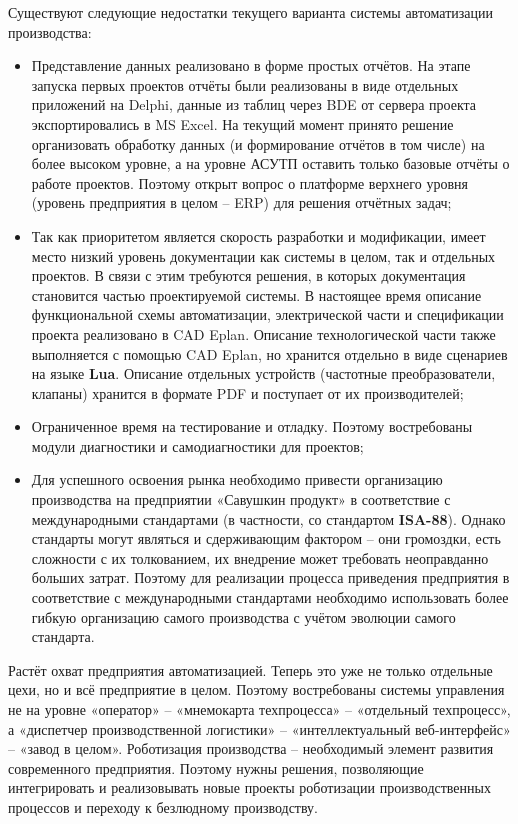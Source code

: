 Существуют следующие недостатки текущего варианта системы автоматизации
производства:
\begin{itemize}
    \item Представление данных реализовано в форме простых отчётов. На этапе
    запуска первых проектов отчёты были реализованы в виде отдельных приложений
    на Delphi, данные из таблиц через BDE от сервера проекта экспортировались в
    MS Excel. На текущий момент принято решение организовать обработку данных (и
    формирование отчётов в том числе) на более высоком уровне, а на уровне АСУТП
    оставить только базовые отчёты о работе проектов. Поэтому открыт вопрос о
    платформе верхнего уровня (уровень предприятия в целом – ERP) для решения
    отчётных задач;
    \item Так как приоритетом является скорость разработки и модификации, имеет
    место низкий уровень документации как системы в целом, так и отдельных
    проектов. В связи с этим требуются решения, в которых документация
    становится частью проектируемой системы. В настоящее время описание
    функциональной схемы автоматизации, электрической части и спецификации
    проекта реализовано в CAD Eplan. Описание технологической части также
    выполняется с помощью CAD Eplan, но хранится отдельно в виде сценариев на
    языке \textbf{Lua}. Описание отдельных устройств (частотные преобразователи,
    клапаны) хранится в формате PDF и поступает от их производителей;
    \item Ограниченное время на тестирование и отладку. Поэтому востребованы
    модули диагностики и самодиагностики для проектов;
    \item Для успешного освоения рынка необходимо привести организацию
    производства на предприятии «Савушкин продукт» в соответствие с
    международными стандартами (в частности, со стандартом \textbf{ISA-88}).
    Однако стандарты могут являться и сдерживающим фактором – они громоздки,
    есть сложности с их толкованием, их внедрение может требовать неоправданно
    больших затрат. Поэтому для реализации процесса приведения предприятия в
    соответствие с международными стандартами необходимо использовать более
    гибкую организацию самого производства с учётом эволюции самого стандарта.
\end{itemize}

Растёт охват предприятия автоматизацией. Теперь это уже не только отдельные
цехи, но и всё предприятие в целом. Поэтому востребованы системы управления не
на уровне «оператор» – «мнемокарта техпроцесса» – «отдельный техпроцесс», а
«диспетчер производственной логистики» – «интеллектуальный веб-интерфейс» –
«завод в целом». Роботизация производства – необходимый элемент развития
современного предприятия. Поэтому нужны решения, позволяющие интегрировать и
реализовывать новые проекты роботизации производственных процессов и переходу к
безлюдному производству.

